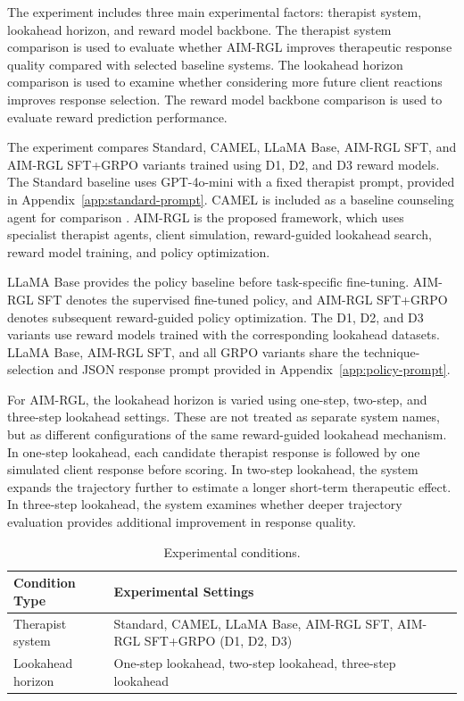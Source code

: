 The experiment includes three main experimental factors: therapist system, lookahead horizon, and reward model backbone. The therapist system comparison is used to evaluate whether AIM-RGL improves therapeutic response quality compared with selected baseline systems. The lookahead horizon comparison is used to examine whether considering more future client reactions improves response selection. The reward model backbone comparison is used to evaluate reward prediction performance.

The experiment compares Standard, CAMEL, LLaMA Base, AIM-RGL SFT, and AIM-RGL SFT+GRPO variants trained using D1, D2, and D3 reward models. The Standard baseline uses GPT-4o-mini with a fixed therapist prompt, provided in Appendix~\ref{app:standard-prompt}. CAMEL is included as a baseline counseling agent for comparison \cite{lee2024cactus}. AIM-RGL is the proposed framework, which uses specialist therapist agents, client simulation, reward-guided lookahead search, reward model training, and policy optimization.

LLaMA Base provides the policy baseline before task-specific fine-tuning. AIM-RGL SFT denotes the supervised fine-tuned policy, and AIM-RGL SFT+GRPO denotes subsequent reward-guided policy optimization. The D1, D2, and D3 variants use reward models trained with the corresponding lookahead datasets. LLaMA Base, AIM-RGL SFT, and all GRPO variants share the technique-selection and JSON response prompt provided in Appendix~\ref{app:policy-prompt}.

For AIM-RGL, the lookahead horizon is varied using one-step, two-step, and three-step lookahead settings. These are not treated as separate system names, but as different configurations of the same reward-guided lookahead mechanism. In one-step lookahead, each candidate therapist response is followed by one simulated client response before scoring. In two-step lookahead, the system expands the trajectory further to estimate a longer short-term therapeutic effect. In three-step lookahead, the system examines whether deeper trajectory evaluation provides additional improvement in response quality.

\begin{table}[htbp]
\centering
\caption{Experimental conditions.}
\begin{tabular}{L{4cm}L{9cm}}
\hline
\textbf{Condition Type} & \textbf{Experimental Settings} \\
\hline
Therapist system & Standard, CAMEL, LLaMA Base, AIM-RGL SFT, AIM-RGL SFT+GRPO (D1, D2, D3) \\
\hline
Lookahead horizon & One-step lookahead, two-step lookahead, three-step lookahead \\
\hline
\end{tabular}
\end{table}

